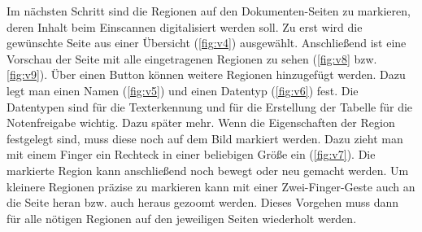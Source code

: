 \documentclass[nomenclature, oneside, 150]{HSMW-Thesis}
\begin{document}
			Im nächsten Schritt sind die Regionen auf den Dokumenten-Seiten zu markieren, deren Inhalt beim Einscannen digitalisiert werden soll. Zu erst wird die gewünschte Seite aus einer Übersicht (\ref{fig:v4}) ausgewählt. Anschließend ist eine Vorschau der Seite mit alle eingetragenen Regionen zu sehen (\ref{fig:v8} bzw. \ref{fig:v9}). Über einen Button können weitere Regionen hinzugefügt werden. Dazu legt man einen Namen (\ref{fig:v5}) und einen Datentyp (\ref{fig:v6}) fest. Die Datentypen sind für die Texterkennung und für die Erstellung der Tabelle für die Notenfreigabe wichtig. Dazu später mehr. Wenn die Eigenschaften der Region festgelegt sind, muss diese noch auf dem Bild markiert werden. Dazu zieht man mit einem Finger ein Rechteck in einer beliebigen Größe ein (\ref{fig:v7}). Die markierte Region kann anschließend noch bewegt oder neu gemacht werden. Um kleinere Regionen präzise zu markieren kann mit einer Zwei-Finger-Geste auch an die Seite heran bzw. auch heraus gezoomt werden. Dieses Vorgehen muss dann für alle nötigen Regionen auf den jeweiligen Seiten wiederholt werden. 
			
\end{document}
